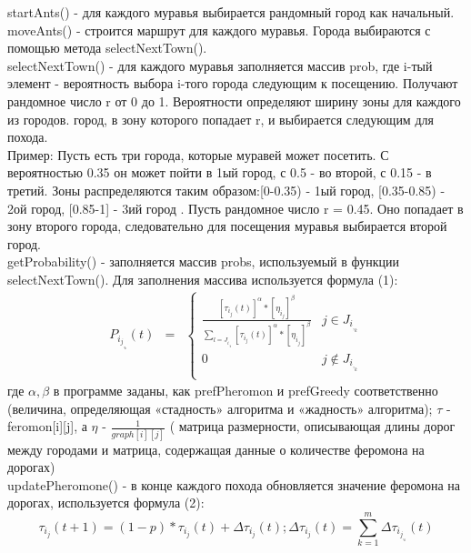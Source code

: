 \documentclass[a4paper,12pt]{article}
\begin{document}
startAnts() - для каждого муравья выбирается рандомный город как начальный.\\

moveAnts() - строится маршрут для каждого муравья. Города выбираются с помощью метода selectNextTown().\\

selectNextTown() - для каждого муравья заполняется массив prob, где i-тый элемент - вероятность выбора i-того города следующим к посещению. Получают рандомное число r от 0 до 1. Вероятности определяют ширину зоны для каждого из городов. город, в зону которого попадает r, и выбирается следующим для похода.\\
Пример: Пусть есть три города, которые муравей может посетить. С вероятностью 0.35 он может пойти в 1ый город, с 0.5 - во второй, с 0.15 - в третий. Зоны распределяются таким образом:[0-0.35) - 1ый город, [0.35-0.85) - 2ой город, [0.85-1] - 3ий город . Пусть рандомное число r = 0.45. Оно попадает в зону второго города, следовательно для посещения муравья выбирается второй город.\\

getProbability() - заполняется массив probs, используемый в функции selectNextTown(). Для заполнения массива используется формула (1):
\begin{equation}
    \begin{matrix}
    P_i_j_,_k(t) & = 
    & \left\{
    \begin{matrix}
    \frac{[\tau_i_j(t)]^\alpha * [\eta_i_j]^\beta}{\sum\limits_{l = J_i_,_k} [\tau_i_j(t)]^\alpha * [\eta_i_j]^\beta }   & j \in J_i_,_k \\
    0 & j \notin J_i_,_k \\
    \end{matrix} \right. 
    \end{matrix}
\end{equation}
где $\alpha, \beta$ в программе заданы, как prefPheromon и prefGreedy соответственно (величина, определяющая «стадность» алгоритма и «жадность» алгоритма); $\tau$ - feromon[i][j], а $\eta$ - $\frac{1}{graph[i][j]}$ ( матрица размерности, описывающая длины дорог между городами и матрица, содержащая данные о количестве феромона на дорогах)\\

updatePheromone() - в конце каждого похода обновляется значение феромона на дорогах, используется формула (2):
\begin{equation}
\tau_i_j(t+1) = (1-p)*\tau_i_j(t) + \Delta\tau_i_j(t); \Delta\tau_i_j(t) = \sum\limits_{k = 1}^{m} \Delta\tau_i_j_,_k(t)
\end{equation}
\end{document}
